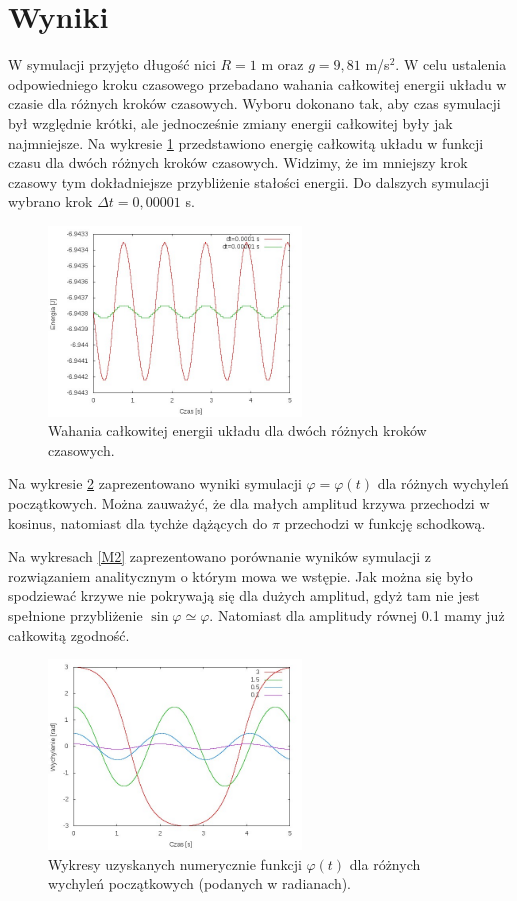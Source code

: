 \documentclass[11pt]{article}
\begin{document}
\section*{Wyniki}
W symulacji przyjęto długość nici $R= 1$ m oraz $g=9,81$ m/s$^2$. W celu ustalenia odpowiedniego 
kroku czasowego przebadano wahania całkowitej energii układu w czasie dla różnych kroków czasowych.
Wyboru dokonano tak, aby czas symulacji był względnie krótki, ale jednocześnie zmiany energii całkowitej
były jak najmniejsze. Na wykresie \ref{E} przedstawiono energię całkowitą układu w funkcji czasu dla dwóch 
różnych kroków czasowych. Widzimy, że im mniejszy krok czasowy tym dokładniejsze przybliżenie stałości energii.
Do dalszych symulacji wybrano krok $\Delta t = 0,00001$ s.

\begin{figure}[h!]
\centering
\includegraphics[width=0.6\textwidth]{eng.jpg}
\caption{Wahania całkowitej energii układu dla dwóch różnych kroków czasowych.}
\label{E}
\end{figure}

Na wykresie \ref{M1} zaprezentowano wyniki symulacji $\varphi = \varphi (t)$ dla różnych wychyleń początkowych. 
Można zauważyć, że dla małych amplitud krzywa przechodzi w kosinus, natomiast dla tychże dążących do $\pi$ przechodzi 
w funkcję schodkową.

Na wykresach \ref{M2} zaprezentowano porównanie wyników symulacji z rozwiązaniem analitycznym o którym mowa we wstępie.
Jak można się było spodziewać krzywe nie pokrywają się dla dużych amplitud, gdyż tam nie jest spełnione przybliżenie 
$\sin \varphi \simeq \varphi.$ Natomiast dla amplitudy równej 0.1 mamy już całkowitą zgodność.

\begin{figure}[h!]
\centering
\includegraphics[width=0.6\textwidth]{multi2.jpg}
\caption{Wykresy uzyskanych numerycznie funkcji $\varphi (t)$ dla 
różnych wychyleń początkowych (podanych w radianach).}
\label{M1}
\end{figure}
\end{document}

